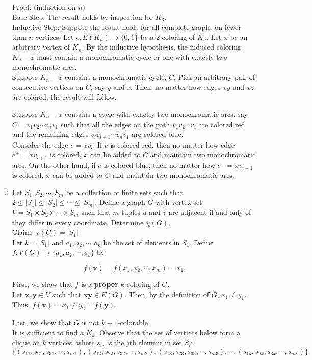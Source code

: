 \documentclass[12pt]{article}
\renewcommand{\emph}[1]{\textsf{\textbf{#1}}}
\begin{document}
\begin{enumerate}
	Proof: (induction on $n$) \\
	Base Step: The result holds by inspection for $K_3.$\\
	Inductive Step: Suppose the result holds for all complete graphs on fewer than $n$ vertices.  Let $c:E(K_n) \to \{0,1\}$ be a 2-coloring of $K_n.$ Let $x$ be an arbitrary vertex of $K_n.$ By the inductive hypothesis, the induced coloring $K_n-x$ must contain a monochromatic cycle or one with exactly two monochromatic arcs. \\
	
	Suppose $K_n-x$ contains a monochromatic cycle, $C.$ Pick an arbitrary pair of consecutive vertices on $C$, say $y$ and $z.$ Then, no matter how edges $xy$ and $xz$ are colored, the result will follow.
	
	Suppose $K_n-x$ contains a cycle with exactly two monochromatic arcs, say $C=v_1v_2 \cdots v_nv_1$ such that all the edges on the path $v_1v_2\cdots v_i$ are colored red and the remaining edges $v_iv_{i+1} \cdots v_nv_1$ are colored blue.\\
	
	Consider the edge $e=xv_i.$ If $e$ is colored red, then no matter how edge $e^+=xv_{i+1}$ is colored, $x$ can be added to $C$ and maintain two monochromatic arcs. On the other hand, if $e$ is colored blue, then no matter how $e^-=xv_{i-1}$ is colored, $x$ can be added to $C$ and maintain two monochromatic arcs.
	
\item Let $S_1,S_2, \cdots,S_m$ be a collection of finite sets such that $2 \leq |S_1| \leq |S_2| \leq \cdots \leq |S_m|.$ Define a graph $G$ with vertex set $V= S_1 \times S_2 \times \cdots \times S_m$ such that $m$-tuples $u$ and $v$ are adjacent if and only of they differ in every coordinate. Determine $\chi(G).$\\

Claim: $\chi(G) = |S_1|$\\

Let $k= |S_1|$ and $a_1,a_2,\cdots,a_k$  be the set of elements in $S_1.$ Define  $f: V(G) \to \{a_1,a_2,\cdots,a_k\}$ by 

$$f( \textbf{x})=f(x_1,x_2,\cdots,x_m)=x_1.$$

First, we show that $f$ is a \emph{proper} $k$-coloring of $G$. \\

Let $\textbf{x},\textbf{y} \in V$ such that $\textbf{x}\textbf{y} \in E(G).$ Then, by the definition of $G$, $x_1 \not = y_1.$ Thus, $f(\textbf{x})=x_1 \not = y_2=f(\textbf{y}).$

Last, we show that $G$ is not $k-1$-colorable.\\

It is sufficient to find a $K_k.$ Observe that the set of vertices below form a clique on $k$ vertices, where $s_{ij}$ is the $j$th element in set $S_i:$\\

$$\{(s_{11},s_{21},s_{31}, \cdots, s_{m1}),(s_{12},s_{22},s_{32}, \cdots, s_{m2}),(s_{13},s_{23},s_{33}, \cdots, s_{m3}), \cdots, (s_{1k},s_{2k},s_{3k}, \cdots, s_{mk})  \}$$

\end{enumerate}
\end{document}
